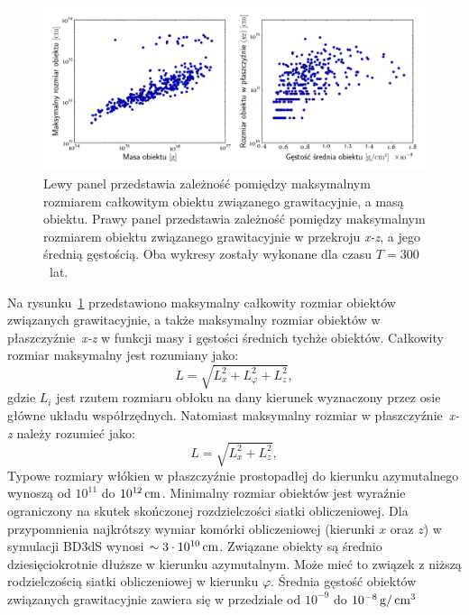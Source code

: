 \begin{figure}[ht]
   \centering
   \includegraphics[width=0.95\linewidth]{figures/fig_mass_size}
   \caption{Lewy panel przedstawia zależność pomiędzy maksymalnym rozmiarem
      całkowitym obiektu związanego grawitacyjnie, a masą obiektu. Prawy panel
      przedstawia zależność pomiędzy maksymalnym rozmiarem obiektu związanego
      grawitacyjnie w przekroju \emph{x-z}, a jego średnią gęstością.  Oba
      wykresy zostały wykonane dla czasu $T=300$~lat. }
   \label{fig:mass_size}
\end{figure}
%
\par Na rysunku~\ref{fig:mass_size} przedstawiono maksymalny całkowity rozmiar
obiektów związanych grawitacyjnie, a także maksymalny rozmiar obiektów w
płaszczyźnie~\emph{x-z} w funkcji masy i gęstości średnich tychże obiektów.
Całkowity rozmiar maksymalny jest rozumiany jako:
\begin{equation}
   L = \sqrt{L_x^2 + L_\varphi^2 + L_z^2},
\end{equation}
gdzie $L_i$ jest rzutem rozmiaru obłoku na dany kierunek wyznaczony przez osie
główne układu współrzędnych. Natomiast maksymalny rozmiar w
płaszczyźnie~\emph{x-z} należy rozumieć jako:
\begin{equation}
   L = \sqrt{L_x^2 + L_z^2},
\end{equation}
Typowe rozmiary włókien w płaszczyźnie prostopadłej do kierunku azymutalnego
wynoszą od $10^{11}$ do $10^{12}\hbox{$\thinspace\textrm{cm}$}$. Minimalny rozmiar obiektów jest wyraźnie
ograniczony na skutek skończonej rozdzielczości siatki obliczeniowej. Dla
przypomnienia najkrótszy wymiar komórki obliczeniowej (kierunki $x$ oraz $z$) w
symulacji BD3dS wynosi $\sim 3\cdot10^{10}\hbox{$\thinspace\textrm{cm}$}$. Związane obiekty są średnio
dziesięciokrotnie dłuższe w kierunku azymutalnym. Może mieć to związek z niższą
rodzielczością siatki obliczeniowej w kierunku $\varphi$.  Średnia gęstość
obiektów związanych grawitacyjnie zawiera się w przedziale od $10^{-9}$ do
$10^{-8}\hbox{$\thinspace\textrm{g}$}/\hbox{$\thinspace\textrm{cm}$}^{3}$

